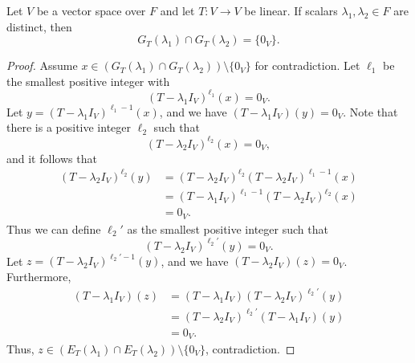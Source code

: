 \begin{theorem}
  Let $V$ be a vector space over $F$ and let $T: V \to V$ be linear.
  If scalars $\lambda_1, \lambda_2 \in F$ are distinct, then
  \begin{equation*}
    G_T(\lambda_1) \cap G_T(\lambda_2) = \{0_V\}.
  \end{equation*}
\end{theorem}
\begin{proof}
  Assume $x \in (G_T(\lambda_1) \cap G_T(\lambda_2)) \setminus \{0_V\}$
  for contradiction.
  Let $\ell_1$ be the smallest positive integer with
  \begin{equation*}
    (T - \lambda_1I_V)^{\ell_1}(x) = 0_V.
  \end{equation*}
  Let $y = (T - \lambda_1I_V)^{\ell_1-1}(x)$, and we have
  $(T - \lambda_1I_V)(y) = 0_V$.
  Note that there is a positive integer $\ell_2$ such that
  \begin{equation*}
    (T - \lambda_2I_V)^{\ell_2}(x) = 0_V,
  \end{equation*}
  and it follows that
  \begin{align*}
    (T - \lambda_2I_V)^{\ell_2}(y)
    &= (T - \lambda_2I_V)^{\ell_2}(T - \lambda_2I_V)^{\ell_1-1}(x) \\
    &= (T - \lambda_1I_V)^{\ell_1-1}(T - \lambda_2I_V)^{\ell_2}(x) \\
    &= 0_V.
  \end{align*}
  Thus we can define $\ell_2'$ as the smallest positive integer such that
  \begin{equation*}
    (T - \lambda_2I_V)^{\ell_2'}(y) = 0_V.
  \end{equation*}
  Let $z = (T - \lambda_2I_V)^{\ell_2'-1}(y)$, and we have
  $(T - \lambda_2I_V)(z) = 0_V$.
  Furthermore,
  \begin{align*}
    (T - \lambda_1I_V)(z)
    &= (T - \lambda_1I_V)(T - \lambda_2I_V)^{\ell_2'}(y) \\
    &= (T - \lambda_2I_V)^{\ell_2'}(T - \lambda_1I_V)(y) \\
    &= 0_V.
  \end{align*}
  Thus, $z \in (E_T(\lambda_1) \cap E_T(\lambda_2)) \setminus \{0_V\}$,
  contradiction.
\end{proof}

